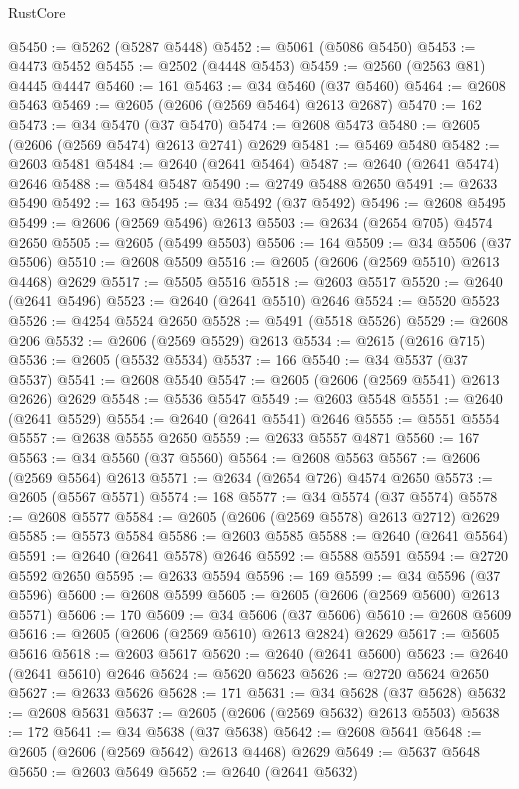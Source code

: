 \begin{lexlean}{RustCore}
\begin{coremodule}
@5450 := @5262 (@5287 @5448)
@5452 := @5061 (@5086 @5450)
@5453 := @4473 @5452
@5455 := @2502 (@4448 @5453)
@5459 := @2560 (@2563 @81) @4445 @4447
@5460 := 161
@5463 := @34 @5460 (@37 @5460)
@5464 := @2608 @5463
@5469 := @2605 (@2606 (@2569 @5464) @2613 @2687)
@5470 := 162
@5473 := @34 @5470 (@37 @5470)
@5474 := @2608 @5473
@5480 := @2605 (@2606 (@2569 @5474) @2613 @2741) @2629
@5481 := @5469 @5480
@5482 := @2603 @5481
@5484 := @2640 (@2641 @5464)
@5487 := @2640 (@2641 @5474) @2646
@5488 := @5484 @5487
@5490 := @2749 @5488 @2650
@5491 := @2633 @5490
@5492 := 163
@5495 := @34 @5492 (@37 @5492)
@5496 := @2608 @5495
@5499 := @2606 (@2569 @5496) @2613
@5503 := @2634 (@2654 @705) @4574 @2650
@5505 := @2605 (@5499 @5503)
@5506 := 164
@5509 := @34 @5506 (@37 @5506)
@5510 := @2608 @5509
@5516 := @2605 (@2606 (@2569 @5510) @2613 @4468) @2629
@5517 := @5505 @5516
@5518 := @2603 @5517
@5520 := @2640 (@2641 @5496)
@5523 := @2640 (@2641 @5510) @2646
@5524 := @5520 @5523
@5526 := @4254 @5524 @2650
@5528 := @5491 (@5518 @5526)
@5529 := @2608 @206
@5532 := @2606 (@2569 @5529) @2613
@5534 := @2615 (@2616 @715)
@5536 := @2605 (@5532 @5534)
@5537 := 166
@5540 := @34 @5537 (@37 @5537)
@5541 := @2608 @5540
@5547 := @2605 (@2606 (@2569 @5541) @2613 @2626) @2629
@5548 := @5536 @5547
@5549 := @2603 @5548
@5551 := @2640 (@2641 @5529)
@5554 := @2640 (@2641 @5541) @2646
@5555 := @5551 @5554
@5557 := @2638 @5555 @2650
@5559 := @2633 @5557 @4871
@5560 := 167
@5563 := @34 @5560 (@37 @5560)
@5564 := @2608 @5563
@5567 := @2606 (@2569 @5564) @2613
@5571 := @2634 (@2654 @726) @4574 @2650
@5573 := @2605 (@5567 @5571)
@5574 := 168
@5577 := @34 @5574 (@37 @5574)
@5578 := @2608 @5577
@5584 := @2605 (@2606 (@2569 @5578) @2613 @2712) @2629
@5585 := @5573 @5584
@5586 := @2603 @5585
@5588 := @2640 (@2641 @5564)
@5591 := @2640 (@2641 @5578) @2646
@5592 := @5588 @5591
@5594 := @2720 @5592 @2650
@5595 := @2633 @5594
@5596 := 169
@5599 := @34 @5596 (@37 @5596)
@5600 := @2608 @5599
@5605 := @2605 (@2606 (@2569 @5600) @2613 @5571)
@5606 := 170
@5609 := @34 @5606 (@37 @5606)
@5610 := @2608 @5609
@5616 := @2605 (@2606 (@2569 @5610) @2613 @2824) @2629
@5617 := @5605 @5616
@5618 := @2603 @5617
@5620 := @2640 (@2641 @5600)
@5623 := @2640 (@2641 @5610) @2646
@5624 := @5620 @5623
@5626 := @2720 @5624 @2650
@5627 := @2633 @5626
@5628 := 171
@5631 := @34 @5628 (@37 @5628)
@5632 := @2608 @5631
@5637 := @2605 (@2606 (@2569 @5632) @2613 @5503)
@5638 := 172
@5641 := @34 @5638 (@37 @5638)
@5642 := @2608 @5641
@5648 := @2605 (@2606 (@2569 @5642) @2613 @4468) @2629
@5649 := @5637 @5648
@5650 := @2603 @5649
@5652 := @2640 (@2641 @5632)

\end{coremodule}
\end{lexlean}
